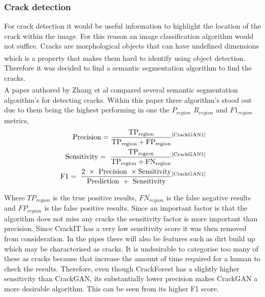 \documentclass[11pt]{article}		%
\newcommand{\supercite}[1]{\textsuperscript{\cite{#1}}}		%
\begin{document}
		\subsubsection{Crack detection}
		
			For crack detection it would be useful information to highlight the location of the crack within the image.
			For this reason an image classification algorithm would not suffice. 
			Cracks are morphological objects that can have undefined dimensions which is a property that makes them hard to identify using object detection.\supercite{morphological}
			Therefore it was decided to find a semantic segmentation algorithm to find the cracks.
			\\
	        A paper authored by Zhang et al\supercite{CrackGAN} compared several semantic segmentation algorithm’s for detecting cracks. 
	        Within this paper three algorithm’s stood out due to them being the highest performing in one the $P_{region}$  $R_{region}$ and $F1_{region}$ metrics,
	        \begin{align}
	        	\rm Precision = \frac{{\rm TP}_{region}}{{\rm TP}_{region}+{\rm FP}_{region}}\supercite{CrackGAN1}
	        	\\
	        	\rm Sensitivity=\ \frac{{\rm TP}_{region}}{{\rm TP}_{region}+{\rm FN}_{region}}\supercite{CrackGAN1}
	        	\\
	        	\rm F1=\ \frac{2\ \times\ \rm Precision\ \times \rm Sensitivity}{\rm Prediction\ +\ \rm Sensitivity}\supercite{CrackGAN1}
	        \end{align}
	    
	       Where $TP_{region}$ is the true positive results, $FN_{region}$ is the false negative results and $FP_{region}$ is the false positive results. Since an important factor is that the algorithm does not miss any cracks the sensitivity factor is more important than precision. 
	        Since CrackIT has a very low sensitivity score it was then removed from consideration. 
	        In the pipes there will also be features such as dirt build up which may be characterised as cracks. 
	        It is undesirable to categorise too many of these as cracks because that increase the amount of time required for a human to check the results.
	        Therefore, even though CrackForest has a slightly higher sensitivity than CrackGAN, its substantially lower precision makes CrackGAN a more desirable algorithm. 
	        This can be seen from its higher F1 score.
        	
\end{document}
